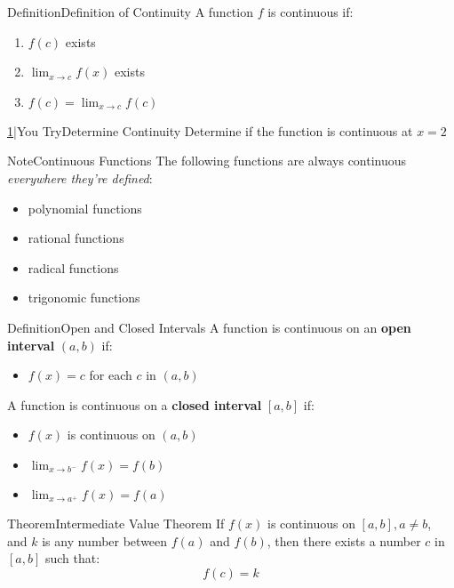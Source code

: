 \documentclass{MathNotes}
\newenvironment{definition}[1]{\begin{RedBox}{Definition}{#1}}{\end{RedBox}}
\newenvironment{note}[1]{\begin{YellowBox}{Note}{#1}}{\end{YellowBox}}
\newenvironment{theorem}[1]{\begin{GrayBox}{Theorem}{#1}}{\end{GrayBox}}
\newenvironment{practice}[2]{\begin{PurpleBox}{\texorpdfstring{#1}\Big|You Try}{#2}}{\end{PurpleBox}}
\begin{document}
\begin{multicols}{2}
	\begin{definition}{Definition of Continuity}\label{def:continuity}
		A function $f$ is continuous if:
		\begin{enumerate}
			\item $f(c)$ exists
			\item $\lim_{x\to c}f(x)$ exists
			\item $f(c)=\lim_{x\to c}f(c)$
		\end{enumerate}
	\end{definition}

	\begin{practice}{\hyperref[ans;continuity]{1}}{Determine Continuity}\label{prac:continuity}
		Determine if the function is continuous at $x=2$
	\end{practice}
\end{multicols}

\begin{note}{Continuous Functions}\label{note:continuous-functions}
	The following functions are always continuous \textit{everywhere
		they're defined}:
	\begin{itemize}
		\item polynomial functions
		\item rational functions
		\item radical functions
		\item trigonomic functions
	\end{itemize}
\end{note}

\begin{definition}{Open and Closed Intervals}\label{def:open-closed-intervals}
	A function is continuous on an \textbf{open interval} $(a, b)$ if:
	\begin{itemize}
		\item $f(x)=c$ for each $c$ in $(a, b)$
	\end{itemize}

	A function is continuous on a \textbf{closed interval} $[a, b]$ if:
	\begin{itemize}
		\item $f(x)$ is continuous on $(a, b)$
		\item $\lim_{x\to b^-}f(x)=f(b)$
		\item $\lim_{x\to a^+}f(x)=f(a)$
	\end{itemize}
\end{definition}

\begin{theorem}{Intermediate Value Theorem}\label{th:intermediate-value-theorem}
	If $f(x)$ is continuous on $[a, b], a\neq b$, and $k$ is any number
	between $f(a)$ and $f(b)$, then there exists a number $c$ in
    $[a, b]$ such that: \[f(c)=k\]
\end{theorem}
\end{document}
